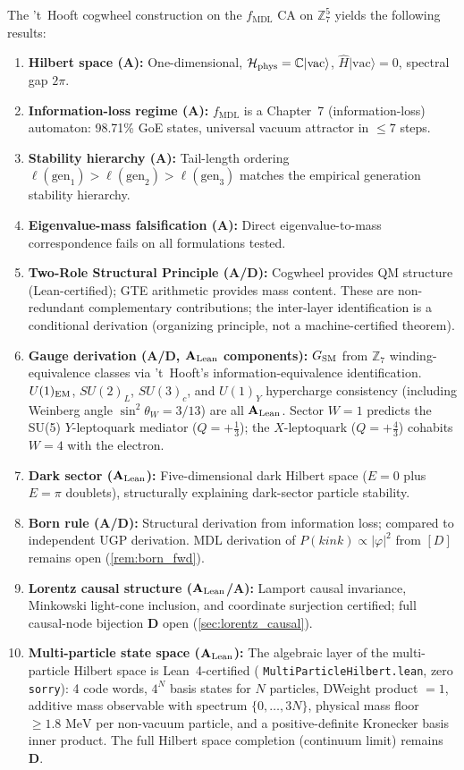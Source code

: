\documentclass[11pt]{article}
\theoremstyle{remark}
\newcommand{\GTE}{\text{GTE}}
\newcommand{\MDL}{\text{MDL}}
\newcommand{\lean}[1]{%
  \penalty-100
  \begingroup\def\_{\textunderscore\allowbreak}\texttt{#1}\endgroup}
\newcommand{\CatA}{\textbf{A}}
\newcommand{\CatAL}{\ensuremath{\textbf{A}_{\rm Lean}}}
\newcommand{\CatAD}{\textbf{A/D}}
\newcommand{\CatD}{\textbf{D}}
\newcommand{\ket}[1]{|{#1}\rangle}
\newcommand{\Hil}{\mathcal{H}}
\newcommand{\Ham}{\hat{H}}
\begin{document}
The 't~Hooft cogwheel construction on the \GTE{} $f_{\MDL}$ CA
on $\mathbb{Z}_7^5$ yields the following results:
\begin{enumerate}[leftmargin=2em]
\item \textbf{Hilbert space (\CatA{}):} One-dimensional, $\Hil_{\rm phys}
  = \mathbb{C}\ket{\text{vac}}$, $\Ham\ket{\text{vac}}=0$, spectral gap
  $2\pi$.
\item \textbf{Information-loss regime (\CatA{}):} $f_{\MDL}$ is a
  Chapter~7 (information-loss) automaton: 98.71\% GoE states, universal
  vacuum attractor in $\leq 7$ steps.
\item \textbf{Stability hierarchy (\CatA{}):} Tail-length ordering
  $\ell(\text{gen}_1) > \ell(\text{gen}_2) > \ell(\text{gen}_3)$ matches
  the empirical generation stability hierarchy.
\item \textbf{Eigenvalue-mass falsification (\CatA{}):} Direct
  eigenvalue-to-mass correspondence fails on all formulations tested.
\item \textbf{Two-Role Structural Principle (\CatAD{}):} Cogwheel provides
  QM structure (Lean-certified); GTE arithmetic provides mass content.
  These are non-redundant complementary contributions; the inter-layer
  identification is a conditional derivation (organizing principle, not a
  machine-certified theorem).
\item \textbf{Gauge derivation (\CatAD{}, \CatAL{} components):}
  $G_{\rm SM}$ from $\mathbb{Z}_7$ winding-equivalence classes via 't~Hooft's
  information-equivalence identification.
  $U(1)_{\rm EM}$, $SU(2)_L$, $SU(3)_c$, and $U(1)_Y$ hypercharge consistency
  (including Weinberg angle $\sin^2\theta_W = 3/13$) are all \CatAL{}.
  Sector $W=1$ predicts the SU(5) $Y$-leptoquark mediator ($Q=+\tfrac{1}{3}$);
  the $X$-leptoquark ($Q=+\tfrac{4}{3}$) cohabits $W=4$ with the electron.
\item \textbf{Dark sector (\CatAL{}):} Five-dimensional dark Hilbert space
  ($E=0$ plus $E=\pi$ doublets), structurally explaining dark-sector
  particle stability.
\item \textbf{Born rule (\CatAD{}):} Structural derivation from information
  loss; compared to independent UGP derivation.
  MDL derivation of $P(kink)\propto|\varphi|^2$ from $[D]$ remains open
  (\cref{rem:born_fwd}).
\item \textbf{Lorentz causal structure (\CatAL{}/\CatA{}):} Lamport causal
  invariance, Minkowski light-cone inclusion, and coordinate surjection
  certified; full causal-node bijection \CatD{} open
  (\cref{sec:lorentz_causal}).
\item \textbf{Multi-particle state space (\CatAL{}):} The algebraic layer
  of the multi-particle Hilbert space is Lean~4-certified
  (\lean{MultiParticleHilbert.lean}, zero \texttt{sorry}):
  4 code words, $4^N$ basis states for $N$ particles, DWeight product $= 1$,
  additive mass observable with spectrum $\{0,\ldots,3N\}$,
  physical mass floor $\geq 1.8\text{ MeV}$ per non-vacuum particle, and
  a positive-definite Kronecker basis inner product.
  The full Hilbert space completion (continuum limit) remains \CatD{}.
\end{enumerate}
\end{document}
